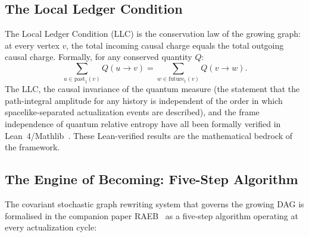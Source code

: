 \documentclass[11pt,a4paper]{article}
\begin{document}
\subsection{The Local Ledger Condition}

The Local Ledger Condition (LLC) is the conservation law of the growing graph:
at every vertex $v$, the total incoming causal charge equals the total
outgoing causal charge. Formally, for any conserved quantity $Q$:
\begin{equation}
  \sum_{u \in \mathrm{past}_1(v)} Q(u \to v)
  = \sum_{w \in \mathrm{future}_1(v)} Q(v \to w).
  \label{eq:LLC}
\end{equation}
The LLC, the causal invariance of the quantum measure (the statement that
the path-integral amplitude for any history is independent of the order
in which spacelike-separated actualization events are described), and the
frame independence of quantum relative entropy have all been formally verified
in Lean~4/Mathlib~\citep{Sandeman2026RAGC}. These Lean-verified results are
the mathematical bedrock of the framework.

\subsection{The Engine of Becoming: Five-Step Algorithm}

The covariant stochastic graph rewriting system that governs the growing
DAG is formalised in the companion paper RAEB~\citep{Sandeman2026RAEB}
as a five-step algorithm operating at every actualization cycle:
\end{document}
